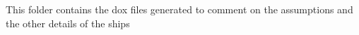 This folder contains the dox files generated to comment on the assumptions and the other details of the ships
